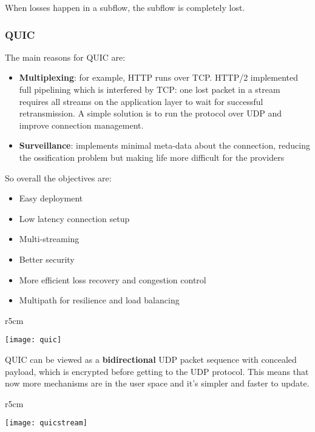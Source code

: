 \begin{observation}[Losses]
	When losses happen in a subflow, the subflow is completely lost.
\end{observation}

\subsubsection{QUIC}
The main reasons for QUIC are:
\begin{itemize}
	\item \textbf{Multiplexing}: for example, HTTP runs over TCP. HTTP/2 implemented full pipelining which is interfered by TCP: one lost packet in a stream requires all streams on the application layer to wait for successful retransmission. A simple solution is to run the protocol over UDP and improve connection management.
	\item \textbf{Surveillance}: implements minimal meta-data about the connection, reducing the ossification problem but making life more difficult for the providers
\end{itemize}
So overall the objectives are:
\begin{itemize}
	\item Easy deployment
	\item Low latency connection setup
	\item Multi-streaming
	\item Better security
	\item More efficient loss recovery and congestion control
	\item Multipath for resilience and load balancing
\end{itemize}

\begin{wrapfigure}[9]{r}{5cm}
	\vspace{-1cm}
	\begin{center}
		\texttt{[image: quic]}
	\end{center}
\end{wrapfigure}
QUIC can be viewed as a \textbf{bidirectional} UDP packet sequence with concealed payload, which is encrypted before getting to the UDP protocol. This means that now more mechanisms are in the user space and it's simpler and faster to update.

\begin{wrapfigure}[9]{r}{5cm}
	\begin{center}
		\texttt{[image: quicstream]}
	\end{center}
\end{wrapfigure}
